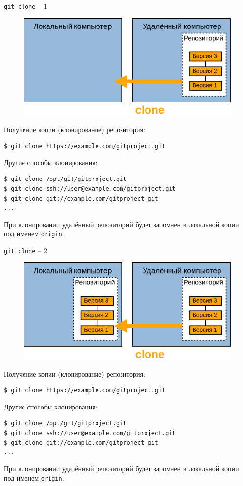 \documentclass[presentation]{beamer}
\begin{document}
\begin{frame}[fragile]{\texttt{git clone} -- 1}
  \begin{figure}[htb]
    \centering
    \includegraphics[width=.6\textwidth]{git-operation-clone-1}
  \end{figure}
  Получение копии (клонирование) репозитория:
\begin{verbatim}
$ git clone https://example.com/gitproject.git
\end{verbatim}

  Другие способы клонирования:
\begin{verbatim}
$ git clone /opt/git/gitproject.git
$ git clone ssh://user@example.com/gitproject.git
$ git clone git://example.com/gitproject.git
...
\end{verbatim}

  \raisebox{-.30em}{\Large\HandRight}\hspace{.25em} При клонировании
  удалённый репозиторий будет запомнен в локальной копии под именем
  \texttt{origin}.
\end{frame}

\begin{frame}[fragile]{\texttt{git clone} -- 2}
  \begin{figure}[htb]
    \centering
    \includegraphics[width=.6\textwidth]{git-operation-clone-2}
  \end{figure}
  Получение копии (клонирование) репозитория:
\begin{verbatim}
$ git clone https://example.com/gitproject.git
\end{verbatim}

  Другие способы клонирования:
\begin{verbatim}
$ git clone /opt/git/gitproject.git
$ git clone ssh://user@example.com/gitproject.git
$ git clone git://example.com/gitproject.git
...
\end{verbatim}

  \raisebox{-.30em}{\Large\HandRight}\hspace{.25em} При клонировании
  удалённый репозиторий будет запомнен в локальной копии под именем
  \texttt{origin}.
\end{frame}
\end{document}
